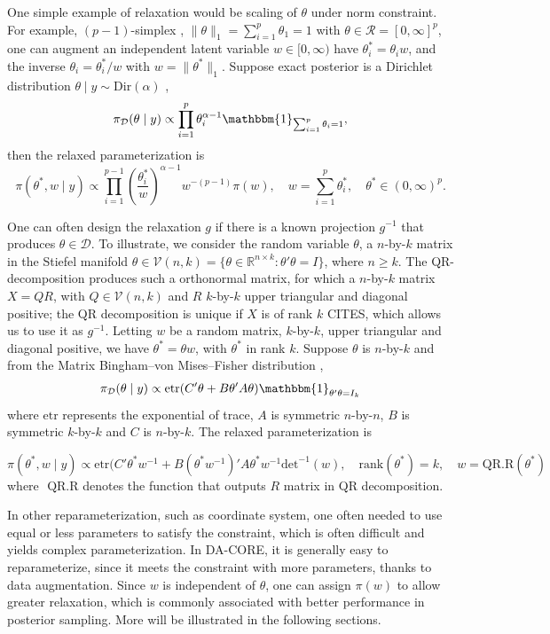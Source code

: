 \documentclass[10pt,fleqn]{article}
\newcommand{\bb}[1]{\mathbb{#1}}
\newcommand{\mc}[1]{\mathcal{#1}}
\DeclareMathOperator{\1}{\mathbbm{1}}
\begin{document}
One simple example of relaxation would be scaling of $\theta$ under  norm constraint. For example, $(p-1)$-simplex ,
$\|\theta\|_1=\sum_{i=1}^p\theta_1=1$ with $\theta\in \mc R=[0,\infty]^p$, one
can augment an independent latent variable $w\in [0,\infty)$ have
$\theta_i^*=\theta_i w$, and the inverse $\theta_i=\theta_i^*/w$ with
$w=\|\theta^*\|_1$. Suppose exact posterior is a Dirichlet distribution 
$\theta\mid y\sim \text{Dir}(\alpha)$
, 
$$
\pi_{\mc D}(\theta \mid y)\propto \prod_{i=1}^p \theta_i^{\alpha-1}\mathbbm{1}_{\sum_{i=1}^p\theta_i=1},$$
then the relaxed parameterization is $$
\pi(\theta^*,w\mid y) \propto  \prod_{i=1}^{p-1} (\frac{\theta_i^*}{w})^{\alpha-1}  w^{-(p-1)} \pi(w), \quad w=\sum_{i=1}^p \theta^*_i, \quad \theta^*\in(0,\infty)^p.$$

One can often design the relaxation $g$ if there is a known projection $g^{-1}$ that produces $\theta\in \mc D$. To illustrate, we consider the random variable
$\theta$, a $n$-by-$k$ matrix in the Stiefel manifold $\theta\in \mc V(n,k)=\{\theta\in \bb R^{n\times
k}: \theta'\theta=I\}$, where $n\ge k$. The QR-decomposition produces such
a orthonormal matrix, for which a $n$-by-$k$ matrix $X=QR$,
with $Q\in \mc V(n,k)$ and $R$ $k$-by-$k$ upper triangular and diagonal positive;
 the
QR decomposition is unique if $X$ is of rank $k$ CITES, which allows us to
use it as $g^{-1}$. Letting $w$ be a random matrix, $k$-by-$k$, upper triangular and diagonal positive, we have $\theta^*=\theta w$, with $\theta^*$ in rank
$k$. Suppose $\theta$ is $n$-by-$k$ and from the Matrix Bingham--von Mises--Fisher distribution
\citep{hoff2009simulation},
$$\pi_{\mc D}(\theta\mid y)\propto \text{etr}(C'\theta+B\theta'A\theta)  \mathbbm{1}_{\theta'\theta=I_k}$$
where $\text{etr}$ represents the exponential of trace, $A$ is symmetric $n$-by-$n$, $B$ is symmetric $k$-by-$k$ and $C$ is $n$-by-$k$. The relaxed
parameterization is

$$\pi(\theta^*, w\mid y)\propto \text{etr}(C'\theta^*w^{-1}+B(\theta^*w^{-1})'A\theta^*w^{-1} \text{det}^{-1}(w), \quad \text{rank}(\theta^*)=k, \quad w= \text{QR.R}(\theta^*)$$
where $\text{ QR.R}$ denotes the function that outputs $R$ matrix in QR decomposition.

In other reparameterization, such as coordinate system, one often
needed to use equal or less parameters to satisfy the constraint, which is
often difficult and yields complex parameterization. In DA-CORE, it is generally
easy to reparameterize, since it meets the constraint with more parameters, thanks to data augmentation. Since $w$ is independent of $\theta$, one can
assign $\pi(w)$ to allow greater relaxation, which is commonly associated
with better performance in posterior sampling. More will be illustrated in
the following sections.
\end{document}
